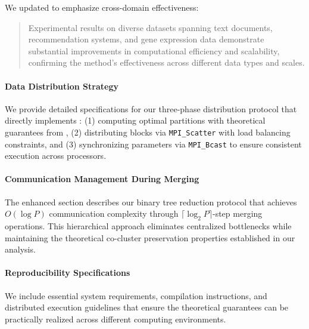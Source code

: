 \documentclass{ar2rc}
\theoremstyle{definition}
\theoremstyle{remark} %
\begin{document}
We updated  to emphasize cross-domain effectiveness:

\begin{quote}
  Experimental results on diverse datasets spanning text documents, recommendation systems, and gene expression data demonstrate substantial improvements in computational efficiency and scalability, confirming the method's effectiveness across different data types and scales.
\end{quote}



\paragraph{Data Distribution Strategy}
We provide detailed specifications for our three-phase distribution protocol that directly implements : (1) computing optimal partitions with theoretical guarantees from , (2) distributing blocks via \texttt{MPI\_Scatter} with load balancing constraints, and (3) synchronizing parameters via \texttt{MPI\_Bcast} to ensure consistent execution across processors.

\paragraph{Communication Management During Merging}
The enhanced section describes our binary tree reduction protocol that achieves $O(\log P)$ communication complexity through $\lceil \log_2 P \rceil$-step merging operations. This hierarchical approach eliminates centralized bottlenecks while maintaining the theoretical co-cluster preservation properties established in our analysis.

\paragraph{Reproducibility Specifications}
We include essential system requirements, compilation instructions, and distributed execution guidelines that ensure the theoretical guarantees can be practically realized across different computing environments.
\end{document}
